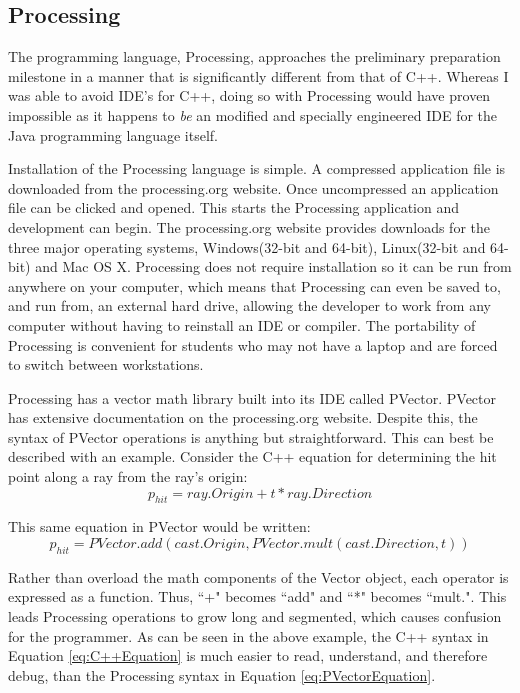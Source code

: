 \subsection{Processing}
The programming language, Processing, approaches the preliminary preparation milestone in a manner that is significantly different from that of C++.  Whereas I was able to avoid IDE's for C++, doing so with Processing would have proven impossible as it happens to \textit{be} an modified and specially engineered IDE for the Java programming language itself.

Installation of the Processing language is simple.  A compressed application file is downloaded from the processing.org website. Once uncompressed an application file can be clicked and opened.  This starts the Processing application and development can begin.  The processing.org website provides downloads for the three major operating systems, Windows(32-bit and 64-bit), Linux(32-bit and 64-bit) and Mac OS X.  Processing does not require installation so it can be run from anywhere on your computer, which means that Processing can even be saved to, and run from, an external hard drive, allowing the developer to work from any computer without having to reinstall an IDE or compiler. The portability of Processing is convenient for students who may not have a laptop and are forced to switch between workstations.

Processing has a vector math library built into its IDE called PVector.  PVector has extensive documentation on the processing.org website.  Despite this, the syntax of PVector operations is anything but straightforward.  This can best be described with an example.  Consider the C++ equation for determining the hit point along a ray from the ray's origin:
\begin{equation}
\label{eq:C++Equation}
p_{hit} = ray.Origin + t*ray.Direction
\end{equation}

This same equation in PVector would be written:
\begin{equation}
\label{eq:PVectorEquation}
p_{hit} = PVector.add(cast.Origin, PVector.mult(cast.Direction,t))
\end{equation}

Rather than overload the math components of the Vector object, each operator is expressed as a function.  Thus, ``+" becomes ``add" and ``*" becomes ``mult.".  This leads Processing operations to grow long and segmented, which causes confusion for the programmer.  As can be seen in the above example, the C++ syntax in Equation \ref{eq:C++Equation} is much easier to read, understand, and therefore debug, than the Processing syntax in Equation \ref{eq:PVectorEquation}.

